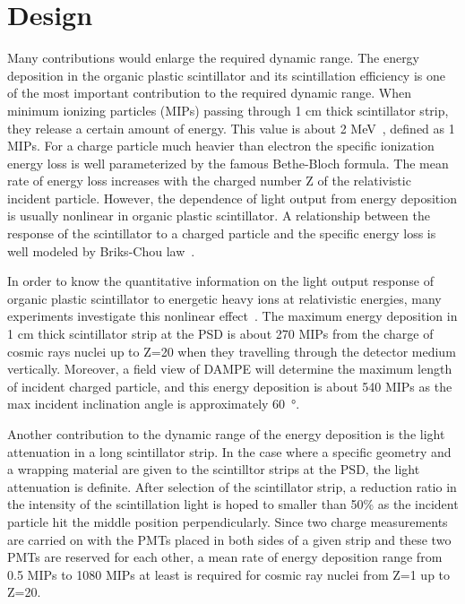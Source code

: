 \documentclass[5p, times]{elsarticle}
\begin{document}
\section{Design}
\label{sec:design}

Many contributions would enlarge the required dynamic range. 
The energy deposition in the organic plastic scintillator and its scintillation efficiency is one of the most important contribution to the required dynamic range. 
When minimum ionizing particles (MIPs) passing through 1 cm thick scintillator strip, they release a certain amount of energy. 
This value is about 2 MeV~\cite{olive_review_2014}, defined as 1 MIPs. 
For a charge particle much heavier than electron the specific ionization energy loss is well parameterized by the famous Bethe-Bloch formula. 
The mean rate of energy loss increases with the charged number Z of the relativistic incident particle. 
However, the dependence of light output from energy deposition is usually nonlinear in organic plastic scintillator. 
A relationship between the response of the scintillator to a charged particle and the specific energy loss is well modeled by Briks-Chou law~\cite{birks1951scintillations,birks1964theory}. 

In order to know the quantitative information on the light output response of organic plastic scintillator to energetic heavy ions at relativistic energies, many experiments investigate this nonlinear effect~\cite{dwyer1985plastic,bindi2005performance,marrocchesi2011beam}. 
The maximum energy deposition in 1 cm thick scintillator strip at the PSD is about 270 MIPs from the charge of cosmic rays nuclei up to Z=20 when they travelling through the detector medium vertically. 
Moreover, a field view of DAMPE will determine the maximum length of incident charged particle, and this energy deposition is about 540 MIPs as the max incident inclination angle is approximately \SI{60}{\degree}.

Another contribution to the dynamic range of the energy deposition is the light attenuation in a long scintillator strip. 
In the case where a specific geometry and a wrapping material are given to the scintilltor strips at the PSD, the light attenuation is definite. 
After selection of the scintillator strip, a reduction ratio in the intensity of the scintillation light is hoped to smaller than 50\% as the incident particle hit the middle position perpendicularly.
Since two charge measurements are carried on with the PMTs placed in both sides of a given strip and these two PMTs are reserved for each other, a mean rate of energy deposition range from 0.5 MIPs to 1080 MIPs at least is required for cosmic ray nuclei from Z=1 up to Z=20.
\end{document}
